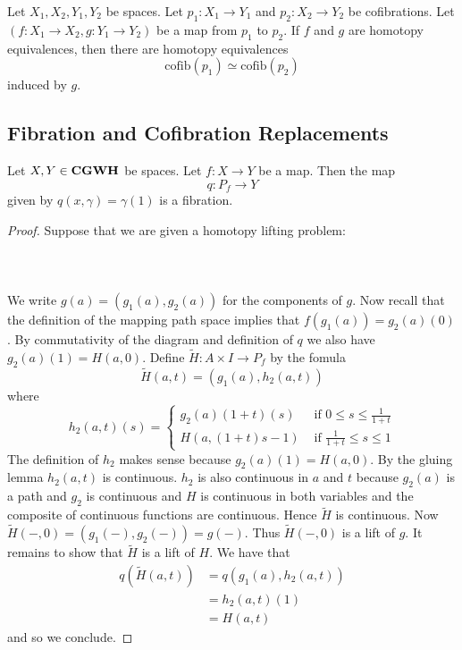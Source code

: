 \documentclass[a4paper]{article}
\begin{document}
\begin{prp}{}{} Let $X_1,X_2,Y_1,Y_2$ be spaces. Let $p_1:X_1\to Y_1$ and $p_2:X_2\to Y_2$ be cofibrations. Let $(f:X_1\to X_2,g:Y_1\to Y_2)$ be a map from $p_1$ to $p_2$. If $f$ and $g$ are homotopy equivalences, then there are homotopy equivalences $$\text{cofib}(p_1)\simeq\text{cofib}(p_2)$$ induced by $g$. 
\end{prp}

\subsection{Fibration and Cofibration Replacements}
\begin{prp}{}{} Let $X,Y\in\bold{CGWH}$ be spaces. Let $f:X\to Y$ be a map. Then the map $$q:P_f\to Y$$ given by $q(x,\gamma)=\gamma(1)$ is a fibration. \tcbline
\begin{proof}
Suppose that we are given a homotopy lifting problem: \\~\\
\\~\\
We write $g(a)=(g_1(a),g_2(a))$ for the components of $g$. Now recall that the definition of the mapping path space implies that $f(g_1(a))=g_2(a)(0)$. By commutativity of the diagram and definition of $q$ we also have $g_2(a)(1)=H(a,0)$. Define $\tilde{H}:A\times I\to P_f$ by the fomula $$\tilde{H}(a,t)=(g_1(a),h_2(a,t))$$ where $$h_2(a,t)(s)=\begin{cases}
g_2(a)(1+t)(s) & \text{ if }0\leq s\leq\frac{1}{1+t}\\
H(a,(1+t)s-1) & \text{ if }\frac{1}{1+t}\leq s\leq 1
\end{cases}$$ The definition of $h_2$ makes sense because $g_2(a)(1)=H(a,0)$. By the gluing lemma $h_2(a,t)$ is continuous. $h_2$ is also continuous in $a$ and $t$ because $g_2(a)$ is a path and $g_2$ is continuous and $H$ is continuous in both variables and the composite of continuous functions are continuous. Hence $\tilde{H}$ is continuous. Now $\tilde{H}(-,0)=(g_1(-),g_2(-))=g(-)$. Thus $\tilde{H}(-,0)$ is a lift of $g$. It remains to show that $\tilde{H}$ is a lift of $H$. We have that 
\begin{align*}
q(\tilde{H}(a,t))&=q(g_1(a),h_2(a,t))\\
&=h_2(a,t)(1)\\
&=H(a,t)
\end{align*}
and so we conclude. 
\end{proof}
\end{prp}
\end{document}
